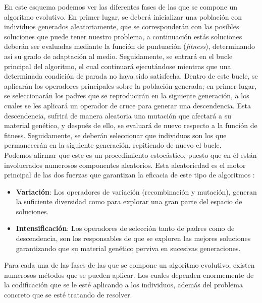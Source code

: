 En este esquema podemos ver las diferentes fases de las que se compone un algoritmo evolutivo. En primer lugar, se deberá inicializar una población con individuos generados aleatoriamente, que se corresponderán con las posibles soluciones que puede tener nuestro problema, a continuación estás soluciones deberán ser evaluadas mediante la función de puntuación (\textit{fitness}), determinando así su grado de adaptación al medio. Seguidamente, se entrará en el bucle principal del algoritmo, el cual continuará ejecutándose mientras que una determinada condición de parada no haya sido satisfecha. Dentro de este bucle, se aplicarán los operadores principales sobre la población generada; en primer lugar, se seleccionarán los padres que se reproducirán en la siguiente generación, a los cuales se les aplicará un operador de cruce para generar una descendencia. Esta descendencia, sufrirá de manera aleatoria una mutación que afectará a su material genético, y después de ello, se evaluará de nuevo respecto a la función de fitness. Seguidamente, se deberán seleccionar que individuos son los que permanecerán en la siguiente generación, repitiendo de nuevo el bucle. \\ 

Podemos afirmar que este es un procedimiento estocástico, puesto que en él están involucrados numerosos componentes aleatorios. Esta aleatoriedad es el motor principal de las dos fuerzas que garantizan la eficacia de este tipo de algoritmos \cite{eiben2003introduction}:

\begin{itemize}
    \item \textbf{Variación}: Los operadores de variación (recombinación y mutación), generan la suficiente diversidad como para explorar una gran parte del espacio de soluciones.
    \item \textbf{Intensificación}: Los operadores de selección tanto de padres como de descendencia, son los responsables de que se exploren las mejores soluciones garantizando que su material genético perviva en sucesivas generaciones.
\end{itemize}

Para cada una de las fases de las que se compone un algoritmo evolutivo, existen numerosos métodos que se pueden aplicar. Los cuales dependen enormemente de la codificación que se le esté aplicando a los individuos, además del problema concreto que se esté tratando de resolver.

